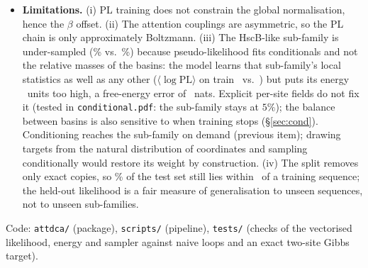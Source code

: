 \documentclass[10pt,a4paper]{article}
\begin{document}
\begin{itemize}
\item \textbf{Limitations.}
      (i) PL training does not constrain the global normalisation, hence the $\beta$ offset.
      (ii) The attention couplings are asymmetric, so the PL chain is only approximately Boltzmann.
      (iii) The HscB-like sub-family is under-sampled (\ClOne\% vs.\ \ClTest\%) because
      pseudo-likelihood fits conditionals and not the relative masses of the basins: the model
      learns that sub-family's local statistics as well as any other
      ($\langle\log\mathrm{PL}\rangle$ on train \PLLmissTrain\ vs.\ \PLLcovTrain) but puts its
      energy \EgapMiss\ units too high, a free-energy error of \dFmiss\ nats. Explicit per-site
      fields do not fix it (tested in \texttt{conditional.pdf}: the sub-family stays at $5\%$); the
      balance between basins is also sensitive to when training stops (\S\ref{sec:cond}).
      Conditioning reaches the sub-family on demand (previous item); drawing targets from the natural
      distribution of coordinates and sampling conditionally would restore its weight by construction.
      (iv) The split removes only exact copies, so \CleanPctNear\% of the test set still lies
      within \SplitThresh\ of a training sequence; the held-out likelihood is a fair measure of
      generalisation to unseen sequences, not to unseen sub-families.
\end{itemize}
Code: \texttt{attdca/} (package), \texttt{scripts/} (pipeline), \texttt{tests/} (checks of the vectorised
likelihood, energy and sampler against naive loops and an exact two-site Gibbs target).
\end{document}
